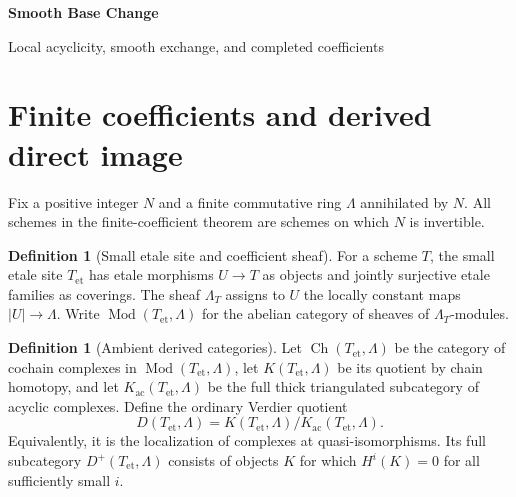 \documentclass[10pt]{article}
\theoremstyle{definition}
\newtheorem{definition}[theorem]{Definition}
\newcommand{\Dplus}{D^+}
\newcommand{\Mod}{\operatorname{Mod}}
\newcommand{\et}{\mathrm{et}}
\begin{document}
\begin{center}
{\large\bfseries Smooth Base Change\par}
\medskip
{\normalsize Local acyclicity, smooth exchange, and completed coefficients\par}
\end{center}

\begin{abstract}
This note decomposes smooth base change into definitions, local geometric
statements, and assembly theorems. The finite-torsion result is first
formulated in an ambient bounded-below derived category. Its restriction to
constructible objects is made only after the necessary boundedness and
constructibility statement. The final sections transport the theorem to the
pro-etale, adic, rational, and algebraically closed coefficient categories.
Every category is an ordinary triangulated category.
\end{abstract}
\tableofcontents

\section{Finite coefficients and derived direct image}

Fix a positive integer $N$ and a finite commutative ring $\Lambda$ annihilated
by $N$. All schemes in the finite-coefficient theorem are schemes on which
$N$ is invertible.

\begin{definition}[Small etale site and coefficient sheaf]
For a scheme $T$, the small etale site $T_{\et}$ has etale morphisms $U\to T$
as objects and jointly surjective etale families as coverings. The sheaf
$\Lambda_T$ assigns to $U$ the locally constant maps $|U|\to\Lambda$. Write
$\Mod(T_{\et},\Lambda)$ for the abelian category of sheaves of
$\Lambda_T$-modules.
\end{definition}

\begin{definition}[Ambient derived categories]
Let $\operatorname{Ch}(T_{\et},\Lambda)$ be the category of cochain complexes
in $\Mod(T_{\et},\Lambda)$, let
$K(T_{\et},\Lambda)$ be its quotient by chain homotopy, and let
$K_{\mathrm{ac}}(T_{\et},\Lambda)$ be the full thick triangulated
subcategory of acyclic complexes. Define the ordinary Verdier quotient
\[
 D(T_{\et},\Lambda)
 =K(T_{\et},\Lambda)/K_{\mathrm{ac}}(T_{\et},\Lambda).
\]
Equivalently, it is the localization of complexes at quasi-isomorphisms.
Its full subcategory $\Dplus(T_{\et},\Lambda)$ consists of objects $K$ for
which $H^i(K)=0$ for all sufficiently small $i$.
\end{definition}
\end{document}
